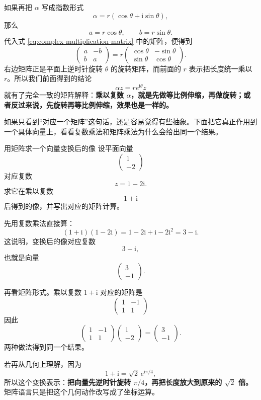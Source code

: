 如果再把 $\alpha$ 写成指数形式
\[
\alpha=r(\cos\theta+\mathrm{i}\sin\theta),
\]
那么
\[
a=r\cos\theta,\qquad b=r\sin\theta.
\]
代入式 \eqref{eq:complex-multiplication-matrix} 中的矩阵，便得到
\begin{equation}
    \begin{pmatrix}
        a & -b\\
        b & a
    \end{pmatrix}
    =
    r
    \begin{pmatrix}
        \cos\theta & -\sin\theta\\
        \sin\theta & \cos\theta
    \end{pmatrix}.
\end{equation}
右边矩阵正是平面上逆时针旋转 $\theta$ 的旋转矩阵，而前面的 $r$ 表示把长度统一乘以 $r$。所以我们前面得到的结论
\[
\alpha z=r e^{\mathrm{i}\theta} z
\]
就有了完全一致的矩阵解释：\textbf{乘以复数 $\alpha$，就是先做等比例伸缩，再做旋转；或者反过来说，先旋转再等比例伸缩，效果也是一样的。}

如果只看到``对应一个矩阵''这句话，还是容易觉得有些抽象。下面把它真正作用到一个具体向量上，看看复数乘法和矩阵乘法为什么会给出同一个结果。

\begin{lizi}{用矩阵求一个向量变换后的像}{}
设平面向量
\[
\begin{pmatrix}
    1\\
    -2
\end{pmatrix}
\]
对应复数
\[
z=1-2\mathrm{i}.
\]
求它在乘以复数
\[
1+\mathrm{i}
\]
后得到的像，并写出对应的矩阵计算。

\begin{jie}
先用复数乘法直接算：
\[
(1+\mathrm{i})(1-2\mathrm{i})
=1-2\mathrm{i}+\mathrm{i}-2\mathrm{i}^2
=3-\mathrm{i}.
\]
这说明，变换后的像对应复数
\[
3-\mathrm{i},
\]
也就是向量
\[
\begin{pmatrix}
    3\\
    -1
\end{pmatrix}.
\]

再看矩阵形式。乘以复数 $1+\mathrm{i}$ 对应的矩阵是
\[
\begin{pmatrix}
    1 & -1\\
    1 & 1
\end{pmatrix}
\]
因此
\[
\begin{pmatrix}
    1 & -1\\
    1 & 1
\end{pmatrix}
\begin{pmatrix}
    1\\
    -2
\end{pmatrix}
=
\begin{pmatrix}
    3\\
    -1
\end{pmatrix}.
\]
两种做法得到同一个结果。

若再从几何上理解，因为
\[
1+\mathrm{i}=\sqrt{2}\,e^{\mathrm{i}\pi/4},
\]
所以这个变换表示：\textbf{把向量先逆时针旋转 $\pi/4$，再把长度放大到原来的 $\sqrt{2}$ 倍。} 矩阵语言只是把这个几何动作改写成了坐标运算。
\end{jie}
\end{lizi}

